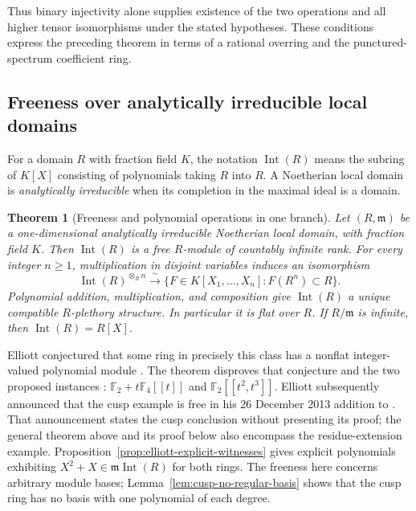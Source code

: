 \documentclass[11pt,a4paper]{article}
\newtheorem{theorem}{Theorem}[section]
\theoremstyle{definition}
\begin{document}
Thus binary injectivity alone supplies existence of the two
operations and all higher tensor isomorphisms under the stated
hypotheses. These conditions express the preceding theorem in terms of a rational
overring and the punctured-spectrum coefficient ring.

\subsection{Freeness over analytically irreducible local domains}
For a domain $R$ with fraction field $K$, the notation
$\operatorname{Int}(R)$ means the subring of $K[X]$ consisting of
polynomials taking $R$ into $R$. A Noetherian local domain is
\emph{analytically irreducible} when its completion in the maximal
ideal is a domain.
\begin{theorem}[Freeness and polynomial operations in one branch]
\label{thm:int-analytic-free}
Let $(R,\mathfrak m)$ be a one-dimensional analytically irreducible
Noetherian local domain, with fraction field $K$. Then
$\operatorname{Int}(R)$ is a free $R$-module of countably infinite
rank. For every integer $n\geq1$, multiplication in disjoint variables
induces an isomorphism
\[
 \operatorname{Int}(R)^{\otimes_R n}
 \xrightarrow{\ \sim\ }
 \{F\in K[X_1,\ldots,X_n]:F(R^n)\subset R\}.
\]
Polynomial addition, multiplication, and composition give
$\operatorname{Int}(R)$ a unique compatible $R$-plethory structure.
In particular it is flat over $R$. If $R/\mathfrak m$ is infinite,
then $\operatorname{Int}(R)=R[X]$.
\end{theorem}
Elliott conjectured that some ring in precisely this class has a
nonflat integer-valued polynomial module
\cite[Conjecture~2.10, author version p.~11]{Elliott2011IntegerTClosure}.
The theorem disproves that conjecture and the two proposed instances
\cite[Conjectures~2.15 and 2.17, author version p.~12]{Elliott2011IntegerTClosure}:
$\mathbb F_2+t\mathbb F_4[[t]]$ and $\mathbb F_2[[t^2,t^3]]$.
Elliott subsequently announced that the cusp example is free in his
26 December 2013 addition to \cite{Elliott2013CuspAnnouncement}.
That announcement states the cusp conclusion without presenting its
proof; the general theorem above and its proof below also encompass
the residue-extension example. Proposition~\ref{prop:elliott-explicit-witnesses} gives explicit
polynomials exhibiting $X^2+X\in\mathfrak m\operatorname{Int}(R)$
for both rings. The freeness here concerns arbitrary module bases;
Lemma~\ref{lem:cusp-no-regular-basis} shows that the cusp ring has
no basis with one polynomial of each degree.
\end{document}
